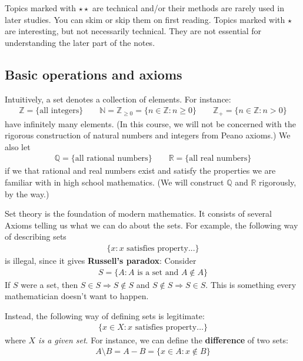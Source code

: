 \documentclass[12pt,b5paper,notitlepage]{article}
\theoremstyle{definition}
\theoremstyle{plain}
\newcommand{\Nbb}{\mathbb N}
\newcommand{\Zbb}{\mathbb Z}
\newcommand{\Qbb}{\mathbb Q}
\newcommand{\Rbb}{\mathbb R}
\numberwithin{equation}{section}
\begin{document}
Topics marked with $\star\star$ are technical and/or their methods are rarely used in later studies. You can skim or skip them on first reading. Topics marked with $\star$ are interesting, but not necessarily technical. They are not essential for understanding the later part of the notes.




\subsection{Basic operations and axioms}
Intuitively, a set denotes a collection of elements. For instance:\index{N@$\Nbb=\{0,1,2,\dots\}$} \index{Z@$\Zbb_+=\{1,2,\dots\}$}
\begin{gather*}
\Zbb=\{\text{all integers}\}\qquad \Nbb=\Zbb_{\geq0}=\{n\in\Zbb:n\geq0\}\qquad \Zbb_+=\{n\in\Zbb:n>0\}
\end{gather*}
have infinitely many elements. (In this course, we will not be concerned with the rigorous construction of natural numbers and integers from Peano axioms.) We also let
\begin{align*}
\Qbb=\{\text{all rational numbers}\}\qquad\Rbb=\{\text{all real numbers}\}
\end{align*}
if we that rational and real numbers exist and satisfy the properties we are familiar with in high school mathematics. (We will construct $\Qbb$ and $\Rbb$ rigorously, by the way.)


Set theory is the foundation of modern mathematics. It consists of several Axioms telling us what we can do about the sets. For example, the following way of describing sets
\begin{align}
\{x: x\text{ satisfies property...}\}  \label{eq1}
\end{align}
is illegal, since it gives \textbf{Russell's paradox}: Consider
\begin{align}
S=\{A: A\text{ is a set and }A\notin A\}\label{eq12}
\end{align}
If $S$ were a set, then $S\in S\Rightarrow S\notin S$ and $S\notin S\Rightarrow S\in S$. This is something every mathematician doesn't want to happen.

Instead, the following way of defining sets is legitimate:
\begin{align}
\{x\in X:x\text{ satisfies property}\dots\}  \label{eq2}
\end{align}
where \emph{$X$ is a given set}.  For instance, we can define the \textbf{difference} of two sets:
\begin{align*}
A\setminus B=A-B=\{x\in A:x\notin B\}
\end{align*}
\end{document}
